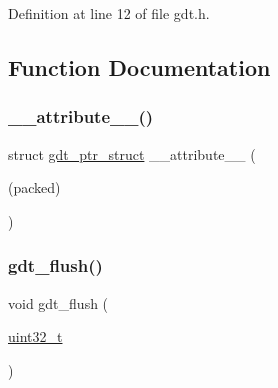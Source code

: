 Definition at line 12 of file gdt.\+h.



\subsection{Function Documentation}
\mbox{\label{a00104_a7e9079c04b56b38b81496b55a836d3e1_a7e9079c04b56b38b81496b55a836d3e1}} 
\subsubsection{\texorpdfstring{\+\_\+\+\_\+attribute\+\_\+\+\_\+()}{\_\_attribute\_\_()}}
{\footnotesize\ttfamily struct \hyperlink{a00232}{gdt\+\_\+ptr\+\_\+struct} \+\_\+\+\_\+attribute\+\_\+\+\_\+ (\begin{DoxyParamCaption}\item[{(packed)}]{ }\end{DoxyParamCaption})}

\mbox{\label{a00104_a62397fecbde23244b570ae632fe926fa_a62397fecbde23244b570ae632fe926fa}} 
\subsubsection{\texorpdfstring{gdt\+\_\+flush()}{gdt\_flush()}}
{\footnotesize\ttfamily void gdt\+\_\+flush (\begin{DoxyParamCaption}\item[{\hyperlink{a00140_a435d1572bf3f880d55459d9805097f62_a435d1572bf3f880d55459d9805097f62}{uint32\+\_\+t}}]{ }\end{DoxyParamCaption})}

\mbox{\label{a00104_af6718a86f3fbcc96b26b09f3742d52a1_af6718a86f3fbcc96b26b09f3742d52a1}} 
